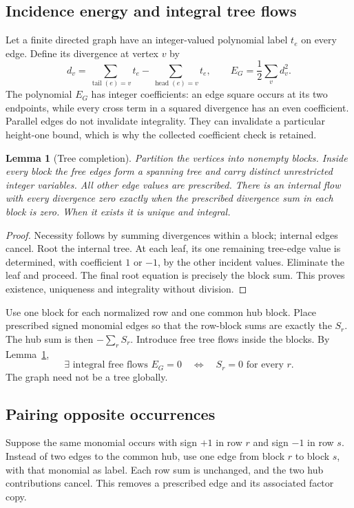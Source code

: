 \documentclass[11pt,letterpaper]{article}
\newtheorem{lemma}[theorem]{Lemma}
\theoremstyle{definition}\newtheorem{definition}[theorem]{Definition}
\theoremstyle{remark}\newtheorem{remark}[theorem]{Remark}
\begin{document}
\subsection{Incidence energy and integral tree flows}

Let a finite directed graph have an integer-valued polynomial label
\(t_e\) on every edge. Define its divergence at vertex \(v\) by
\[
 d_v=\sum_{\operatorname{tail}(e)=v}t_e
       -\sum_{\operatorname{head}(e)=v}t_e,
 \qquad E_G=\frac12\sum_v d_v^2.
\]
The polynomial \(E_G\) has integer coefficients: an edge square occurs
at its two endpoints, while every cross term in a squared divergence
has an even coefficient. Parallel edges do not invalidate integrality.
They can invalidate a particular height-one bound, which is why the
collected coefficient check is retained.

\begin{lemma}[Tree completion]\label{lem:tree}
Partition the vertices into nonempty blocks. Inside every block the
free edges form a spanning tree and carry distinct unrestricted integer
variables. All other edge values are prescribed. There is an internal
flow with every divergence zero exactly when the prescribed divergence
sum in each block is zero. When it exists it is unique and integral.
\end{lemma}
\begin{proof}
Necessity follows by summing divergences within a block; internal edges
cancel. Root the internal tree. At each leaf, its one remaining tree-edge
value is determined, with coefficient \(1\) or \(-1\), by the other
incident values. Eliminate the leaf and proceed. The final root equation
is precisely the block sum. This proves existence, uniqueness and
integrality without division.
\end{proof}

Use one block for each normalized row and one common hub block. Place
prescribed signed monomial edges so that the row-block sums are exactly
the \(S_r\). The hub sum is then \(-\sum_rS_r\). Introduce free tree
flows inside the blocks. By Lemma~\ref{lem:tree},
\[
 \exists\text{ integral free flows } E_G=0
 \quad\Longleftrightarrow\quad S_r=0\text{ for every }r.
\]
The graph need not be a tree globally.

\subsection{Pairing opposite occurrences}

Suppose the same monomial occurs with sign \(+1\) in row \(r\) and
sign \(-1\) in row \(s\). Instead of two edges to the common hub,
use one edge from block \(r\) to block \(s\), with that monomial
as label. Each row sum is unchanged, and the two hub contributions
cancel. This removes a prescribed edge and its associated factor copy.
\end{document}

